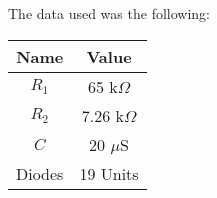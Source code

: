 The data used was the following:

\begin{center}
  \begin{tabular}{ | c | c | }
    \hline    
    {\bf Name} & {\bf Value} \\ \hline
    $R_1$ & 65 k$\Omega$ \\ \hline 
    $R_2$ & 7.26 k$\Omega$ \\ \hline 
    $C$ & 20 $\mu$S \\ \hline
    Diodes & 19 Units \\ 
    \hline
  \end{tabular}
\end{center}



